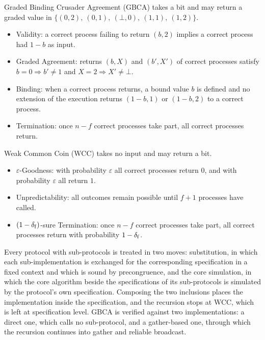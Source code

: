 Graded Binding Crusader Agreement (GBCA) takes a bit and may return a graded value in $\{(0,2),\ (0,1),\ (\bot,0),\ (1,1),\ (1,2)\}$.
\begin{itemize}
  \item Validity: a correct process failing to return $(b,2)$ implies a correct process had $1-b$ as input.
  \item Graded Agreement: returns $(b,X)$ and $(b',X')$ of correct processes satisfy $b = 0 \Rightarrow b' \neq 1$ and $X = 2 \Rightarrow X' \neq \bot$.
  \item Binding: when a correct process returns, a bound value $b$ is defined and no extension of the execution returns $(1-b,1)$ or $(1-b,2)$ to a correct process.
  \item Termination: once $n-f$ correct processes take part, all correct processes return.
\end{itemize}

Weak Common Coin (WCC) takes no input and may return a bit.
\begin{itemize}
  \item $\varepsilon$-Goodness: with probability $\varepsilon$ all correct processes return $0$, and with probability $\varepsilon$ all return $1$.
  \item Unpredictability: all outcomes remain possible until $f+1$ processes have called.
  \item $(1-\delta_{\mathrm{f}})$-sure Termination: once $n-f$ correct processes take part, all correct processes return with probability $1-\delta_{\mathrm{f}}$.
\end{itemize}

Every protocol with sub-protocols is treated in two moves: substitution, in which each sub-implementation is exchanged for the corresponding specification in a fixed context and which is sound by precongruence, and the core simulation, in which the core algorithm beside the specifications of its sub-protocols is simulated by the protocol's own specification.
Composing the two inclusions places the implementation inside the specification, and the recursion stops at WCC, which is left at specification level.
GBCA is verified against two implementations: a direct one, which calls no sub-protocol, and a gather-based one, through which the recursion continues into gather and reliable broadcast.

